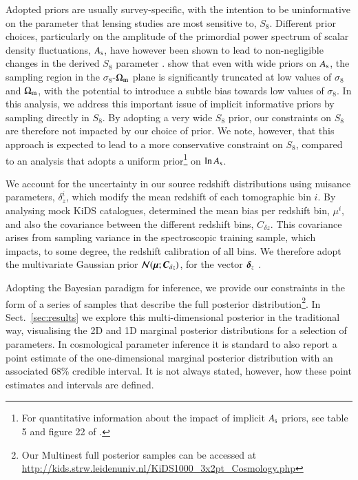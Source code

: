 Adopted priors are usually survey-specific, with the intention to be uninformative on the parameter that lensing studies are most sensitive to, $S_8$.  
Different prior choices, particularly on the amplitude of the primordial power spectrum of scalar density fluctuations, $A_{\rm s}$, have however been shown to lead to non-negligible changes in the derived $S_8$ parameter \citep{joudaki/etal:2017,chang/etal:2019, joudaki/etal:2020, asgari/etal:2020_KD}. 
\citet{joachimi/etal:inprep} show that even with wide priors on $A_{\rm s}$,  the sampling region in the $\sigma_8$-$\Omega_{\rm m}$ plane is significantly truncated at low values of $\sigma_8$ and $\Omega_{\rm m}$, with the potential to introduce a subtle bias towards low values of $\sigma_8$.   In this analysis, we address this important issue of implicit informative priors by sampling directly in $S_8$.   By adopting a very wide $S_8$ prior, our constraints on $S_8$ are therefore not impacted by our choice of prior.  We note, however, that this approach is expected to lead to a more conservative constraint on $S_8$, compared to an analysis that adopts a uniform prior\footnote{For quantitative information about the impact of implicit $A_{\rm s}$ priors, see table 5 and figure 22 of \citet{joachimi/etal:inprep}.} on $\ln A_{\rm s}$.

We account for the uncertainty in our source redshift distributions using nuisance parameters, $\delta_z^i$, which modify the mean redshift of each tomographic bin $i$.   By analysing mock KiDS catalogues, \citet{wright/etal:2020} determined the mean bias per redshift bin, $\mu^i$, and also the covariance between the different redshift bins, $C_{\delta z}$.   This covariance arises from sampling variance in the spectroscopic training sample, which impacts, to some degree, the redshift calibration of all bins.    We therefore adopt the multivariate Gaussian prior ${\cal N}(\mbox{\boldmath $\mu$};\mbox{\boldmath $C$}_{\delta z})$, for the vector $\mbox{\boldmath $\delta$}_z$ \citep[see section 3 of][for details]{hildebrandt/etal:inprep}. 

Adopting the Bayesian paradigm for inference, we provide our constraints in the form of a series of samples that describe the full posterior 
distribution\footnote{Our {\sc Multinest} full posterior samples can be accessed at \url{http://kids.strw.leidenuniv.nl/KiDS1000_3x2pt_Cosmology.php}}.  
In Sect.~\ref{sec:results} we explore this multi-dimensional posterior in the traditional way, visualising the 2D and 1D marginal posterior distributions for a selection of parameters.  
In cosmological parameter inference it is standard to also report a point estimate of the one-dimensional marginal posterior distribution with an associated 68\% credible interval.   It
is not always stated, however, how these point estimates and intervals are defined.   

